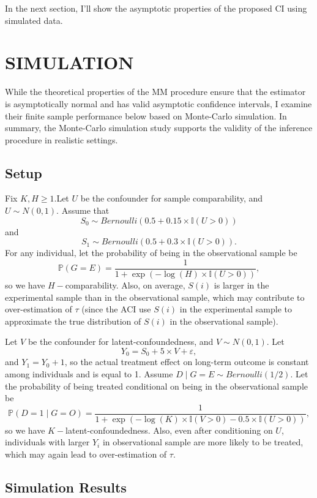 \documentclass[12pt]{article}
\begin{document}
	In the next section, I'll show the asymptotic properties of the proposed CI using simulated data.
	
	\section{SIMULATION}
	
	While the theoretical properties of the MM procedure ensure that the estimator is asymptotically normal and has valid asymptotic confidence intervals, I examine their finite sample performance below based on Monte-Carlo simulation. In summary, the Monte-Carlo simulation study supports the validity of the inference procedure in realistic settings. 

	\subsection{Setup}
	Fix $K,H \geq 1$.Let $U$ be the confounder for sample comparability, and $U \sim N(0,1)$. Assume that $$S_0 \sim Bernoulli(0.5 + 0.15 \times \mathbb{I}(U > 0))$$ and $$S_1 \sim Bernoulli(0.5 + 0.3 \times \mathbb{I}(U > 0)).$$
    For any individual, let the probability of being in the observational sample be $$\mathbb{P}(G = E) = \frac{1}{1 + \exp (-\log(H) \times \mathbb{I}(U > 0) )},$$ so we have $H-$comparability. Also, on average, $S(i)$ is larger in the experimental sample than in the observational sample, 
    which may contribute to over-estimation of $\tau$ (since the ACI use $S(i)$ in the experimental sample to approximate the true distribution of $S(i)$ in the observational sample). 

    Let $V$ be the confounder for latent-confoundedness, and $V \sim N(0,1)$. Let $$Y_0 = S_0 + 5 \times V + \varepsilon,$$ and $Y_1 = Y_0 + 1$, so the actual treatment effect on long-term outcome is constant among individuals and is equal to 1. Assume $D \mid G = E \sim Bernoulli(1/2)$.
    Let the probability of being treated conditional on being in the observational sample be $$\mathbb{P}(D = 1 \mid G = O) = \frac{1}{1 + \exp (-\log(K) \times \mathbb{I}(V > 0) - 0.5 \times \mathbb{I}(U > 0) )},$$ so we have $K-$latent-confoundedness. 
    Also, even after conditioning on $U$, individuals with larger $Y_i$ in observational sample are more likely to be treated, 
    which may again lead to over-estimation of $\tau$.
    
    \subsection{Simulation Results}
    
\end{document}

